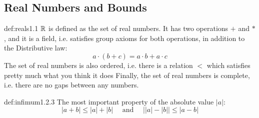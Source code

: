 \documentclass[landscape, 8pt]{extarticle}
\begin{document}
\begin{multicols}{3}
\subsection*{Real Numbers and Bounds}
\begin{dfn}{def:reals}{1.1}
$\mathbb{R}$ is defined as the set of real numbers. It has two operations $+$ and $\ast$, and it is a field, i.e. satisfies group axioms for both operations, in addition to the Distributive law:
\[a\cdot(b+c) = a\cdot b + a\cdot c\]
The set of real numbers is also ordered, i.e. there is a relation $<$ which satisfies pretty much what you think it does
\vspace{0pt}\newline
Finally, the set of real numbers is complete, i.e. there are no gaps between any numbers.
\end{dfn}
\vspace{-5pt}

\begin{dfn}{def:infimum}{1.2.3}
    The most important property of the absolute value $\lvert a\rvert $:
    \[\lvert a+b\rvert \le \lvert a\rvert + \lvert b\rvert \quad\text{ and }\quad \lvert \lvert a\rvert - \lvert b\rvert \rvert \le \lvert a-b\rvert \]
\end{dfn}
\vspace{-5pt}


\end{multicols}
\end{document}
